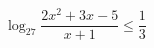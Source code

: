 \begin{ex}
	\begin{condition}
	\( \log_{27}\dfrac{2x^2+3x-5}{x+1}\leq\dfrac{1}{3} \)
	\end{condition}
	\answer{\( (-2,5;-2]\cup(1;2] \)}
\end{ex}